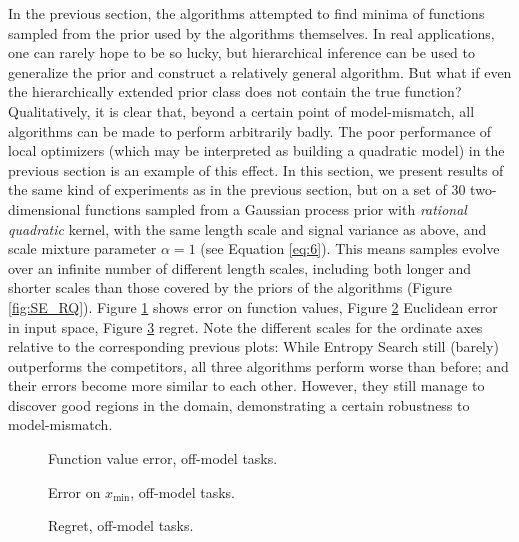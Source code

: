 \documentclass[twoside,11pt]{article}
\newcommand{\xmin}{x_{\min}}
\newcommand{\inputTikZ}[1]{%
 }
\newcommand{\inputTikZ}[1]{%
   \beginpgfgraphicnamed{#1-external}%
   \endpgfgraphicnamed%
 }
\begin{document}
In the previous section, the algorithms attempted to find minima of
functions sampled from the prior used by the algorithms themselves. In
real applications, one can rarely hope to be so lucky, but
hierarchical inference can be used to generalize the prior and
construct a relatively general algorithm. But what if even the
hierarchically extended prior class does not contain the true
function? Qualitatively, it is clear that, beyond a certain point of
model-mismatch, all algorithms can be made to perform arbitrarily
badly. The poor performance of local optimizers (which may be
interpreted as building a quadratic model) in the previous section is
an example of this effect. In this section, we present results of the
same kind of experiments as in the previous section, but on a set of
30 two-dimensional functions sampled from a Gaussian process prior
with \emph{rational quadratic} kernel, with the same length scale and
signal variance as above, and scale mixture parameter $\alpha=1$ (see
Equation \eqref{eq:6}). This means samples evolve over an infinite
number of different length scales, including both longer and shorter
scales than those covered by the priors of the algorithms (Figure
\ref{fig:SE_RQ}). Figure \ref{fig:fval_offmodel} shows error on
function values, Figure \ref{fig:xval_offmodel} Euclidean error in
input space, Figure \ref{fig:regret-off} regret. Note the different
scales for the ordinate axes relative to the corresponding previous
plots: While Entropy Search still (barely) outperforms the
competitors, all three algorithms perform worse than before; and their
errors become more similar to each other. However, they still manage
to discover good regions in the domain, demonstrating a certain
robustness to model-mismatch.

\begin{figure}
  \centering
  \inputTikZ{figures/fdist_wB_2D_RQ}
  \caption{Function value error, off-model tasks.}
  \label{fig:fval_offmodel}
\end{figure}

\begin{figure}
  \centering
  \inputTikZ{figures/xdist_wB_2D_RQ}
  \caption{Error on $\xmin$, off-model tasks.}
  \label{fig:xval_offmodel}
\end{figure}


\begin{figure}
  \centering
  \inputTikZ{figures/regret_2D_wB_RQ}
  \caption{Regret, off-model tasks.}
  \label{fig:regret-off}
\end{figure}
\end{document}

